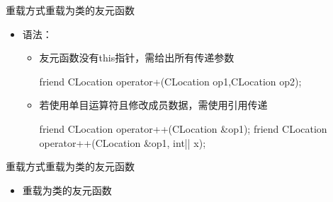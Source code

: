 \begin{frame}[t, fragile]{重载方式}{重载为类的友元函数}%
  \stretchon
  \begin{itemize}
  \item 语法：
    \begin{itemize}
    \item 友元函数\alert{没有this指针}，需给出所有传递参数
      \begin{cppcode}
friend CLocation operator+(CLocation op1,CLocation op2);
      \end{cppcode}
    \item 若使用单目运算符且修改成员数据，\alert{需使用引用传递}
      \begin{cpptt}
friend CLocation operator++(CLocation &op1);
friend CLocation operator++(CLocation &op1, int|| x);
      \end{cpptt}
      \vspace{4ex}
      \hfill {}
    \end{itemize}
  \end{itemize}
  \stretchoff
\end{frame}

\begin{frame}[t, fragile]{重载方式}{重载为类的友元函数}%
  \begin{itemize}
  \item 重载为类的友元函数\\
    \begin{center}
    \end{center}
  \end{itemize}
\end{frame}


